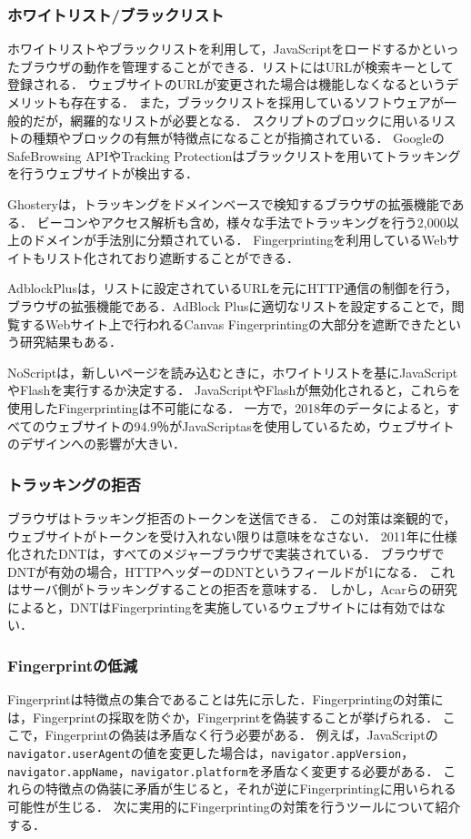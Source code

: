 \subsubsection{ホワイトリスト/ブラックリスト}
ホワイトリストやブラックリストを利用して，JavaScriptをロードするかといったブラウザの動作を管理することができる．リストにはURLが検索キーとして登録される．
ウェブサイトのURLが変更された場合は機能しなくなるというデメリットも存在する．
また，ブラックリストを採用しているソフトウェアが一般的だが，網羅的なリストが必要となる．
スクリプトのブロックに用いるリストの種類やブロックの有無が特徴点になることが指摘されている．
GoogleのSafeBrowsing APIやTracking Protectionはブラックリストを用いてトラッキングを行うウェブサイトが検出する．

Ghostery\cite{Ghostery}は，トラッキングをドメインベースで検知するブラウザの拡張機能である．
ビーコンやアクセス解析も含め，様々な手法でトラッキングを行う2,000以上のドメインが手法別に分類されている．
Fingerprintingを利用しているWebサイトもリスト化されており遮断することができる．

AdblockPlus\cite{acar2014web}は，リストに設定されているURLを元にHTTP通信の制御を行う，ブラウザの拡張機能である．AdBlock Plusに適切なリストを設定することで，閲覧するWebサイト上で行われるCanvas Fingerprintingの大部分を遮断できたという研究結果もある．

NoScriptは，新しいページを読み込むときに，ホワイトリストを基にJavaScriptやFlashを実行するか決定する．
JavaScriptやFlashが無効化されると，これらを使用したFingerprintingは不可能になる．
一方で，2018年のデータによると\cite{javascript_usage}，すべてのウェブサイトの94.9％がJavaScriptasを使用しているため，ウェブサイトのデザインへの影響が大きい．
\subsubsection{トラッキングの拒否}
ブラウザはトラッキング拒否のトークンを送信できる．
この対策は楽観的で，ウェブサイトがトークンを受け入れない限りは意味をなさない．
2011年に仕様化されたDNT\cite{dnt}は，すべてのメジャーブラウザで実装されている．
ブラウザでDNTが有効の場合，HTTPヘッダーのDNTというフィールドが1になる．
これはサーバ側がトラッキングすることの拒否を意味する．
しかし，Acarら\cite{acar2013fpdetective}の研究によると，DNTはFingerprintingを実施しているウェブサイトには有効ではない．
\subsubsection{Fingerprintの低減}
Fingerprintは特徴点の集合であることは先に示した．Fingerprintingの対策には，Fingerprintの採取を防ぐか，Fingerprintを偽装することが挙げられる．
ここで，Fingerprintの偽装は矛盾なく行う必要がある．
例えば，JavaScriptの\texttt{navigator.userAgent}の値を変更した場合は，\texttt{navigator.appVersion}，\texttt{navigator.appName}，\texttt{navigator.platform}を矛盾なく変更する必要がある．
これらの特徴点の偽装に矛盾が生じると，それが逆にFingerprintingに用いられる可能性が生じる．
次に実用的にFingerprintingの対策を行うツールについて紹介する．

